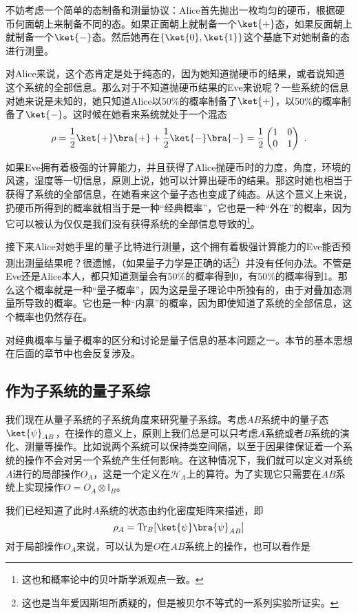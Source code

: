 不妨考虑一个简单的态制备和测量协议：Alice首先抛出一枚均匀的硬币，根据硬币何面朝上来制备不同的态。如果正面朝上就制备一个$\ket{+}$态，如果反面朝上就制备一个$\ket{-}$态。然后她再在$\{\ket{0},\ket{1}\}$这个基底下对她制备的态进行测量。

对Alice来说，这个态肯定是处于纯态的，因为她知道抛硬币的结果，或者说知道这个系统的全部信息。那么对于不知道抛硬币结果的Eve来说呢？一些系统的信息对她来说是未知的，她只知道Alice以50\%的概率制备了$\ket{+}$，以50\%的概率制备了$\ket{-}$。这时候在她看来系统就处于一个混态
\begin{equation}
\rho=\frac{1}{2}\ket{+}\bra{+}+\frac{1}{2}\ket{-}\bra{-}=\frac{1}{2}\begin{pmatrix}
1 & 0\\
0 & 1
\end{pmatrix}~.
\end{equation}

如果Eve拥有着极强的计算能力，并且获得了Alice抛硬币时的力度，角度，环境的风速，湿度等一切信息，原则上说，她可以计算出硬币的结果。那这时她也相当于获得了系统的全部信息，在她看来这个量子态也变成了纯态。从这个意义上来说，扔硬币所得到的概率就相当于是一种“经典概率”，它也是一种“外在”的概率，因为它可以被认为仅仅是我们没有获得系统的全部信息导致的\footnote{这也和概率论中的贝叶斯学派观点一致。}。

接下来Alice对她手里的量子比特进行测量，这个拥有着极强计算能力的Eve能否预测出测量结果呢？很遗憾，（如果量子力学是正确的话\footnote{这也是当年爱因斯坦所质疑的，但是被贝尔不等式的一系列实验所证实。}）并没有任何办法。不管是Eve还是Alice本人，都只知道测量会有50\%的概率得到0，有50\%的概率得到1。那么这个概率就是一种“量子概率”，因为这是量子理论中所独有的，由于对叠加态测量所导致的概率。它也是一种“内禀”的概率，因为即使知道了系统的全部信息，这个概率也仍然存在。

对经典概率与量子概率的区分和讨论是量子信息的基本问题之一。本节的基本思想在后面的章节中也会反复涉及。

\subsection{作为子系统的量子系综}


我们现在从量子系统的子系统角度来研究量子系综。考虑$AB$系统中的量子态$\ket{\psi}_{AB}$，在操作的意义上，原则上我们总是可以只考虑$A$系统或者$B$系统的演化、测量等操作。比如说两个系统可以保持类空间隔，以至于因果律保证着一个系统的操作不会对另一个系统产生任何影响。在这种情况下，我们就可以定义对系统$A$进行的局部操作$O_A$，这是一个定义在$\mathcal{H}_A$上的算符。为了实现它只需要在$AB$系统上实现操作$O=O_A\otimes\mathbb{I}_B$。

我们已经知道了此时$A$系统的状态由约化密度矩阵来描述，即
\begin{equation}
\rho_A=\operatorname{Tr}_B[\ket{\psi}\bra{\psi}_{AB}]
\end{equation}
对于局部操作$O_A$来说，可以认为是$O$在$AB$系统上的操作，也可以看作是



